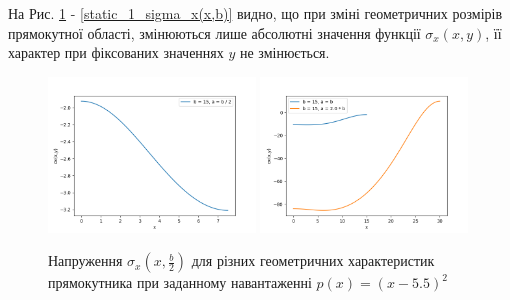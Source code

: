 На Рис. \ref{static_1_sigma_x(x,b:2)} - \ref{static_1_sigma_x(x,b)} видно, що при зміні геометричних розмірів прямокутної області,
змінюються лише абсолютні значення функції $\sigma_x(x, y)$, її характер при фіксованих значеннях $y$ не змінюється.

\begin{figure}[H]
    \begin{center}
        \includegraphics[width=0.49\textwidth, scale=1]{images/results/static_1/sigma_x(x,b:2)1.png}
        \includegraphics[width=0.49\textwidth, scale=1]{images/results/static_1/sigma_x(x,b:2)2.png}
        \caption{Напруження $\sigma_x(x, \frac{b}{2})$ для різних геометричних характеристик прямокутника при заданному навантаженні $p(x) = (x - 5.5)^2$}\label{static_1_sigma_x(x,b:2)}
    \end{center}
\end{figure}
